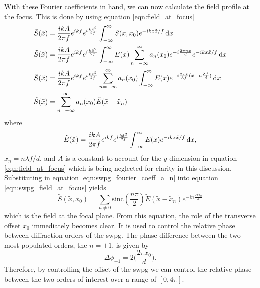 With these Fourier coefficients in hand, we can now calculate the field profile at the focus.  This is done by using equation \ref{eqn:field_at_focus}
\begin{equation}
\label{eqn:swpg_field_at_focus}
	\begin{aligned}
		\tilde{S}(\tilde{x}) &= \frac{i k A}{2\pi f}e^{ikf}e^{i\frac{k\tilde{x}^2}{2f}}\int_{-\infty}^{\infty}S(x,x_0)e^{-ikx\tilde{x}/f}\mathop{}\!\mathrm{d} x\\
		\tilde{S}(\tilde{x}) &= \frac{i k A}{2\pi f}e^{ikf}e^{i\frac{k\tilde{x}^2}{2f}}\int_{-\infty}^{\infty} E(x) \sum_{n=-\infty}^{\infty}a_n(x_0)e^{-i\frac{2\pi nx}{d}} e^{-ikx\tilde{x}/f}\mathop{}\!\mathrm{d} x\\
		\tilde{S}(\tilde{x}) &= \frac{i k A}{2\pi f}e^{ikf}e^{i\frac{k\tilde{x}^2}{2f}}\sum_{n=-\infty}^{\infty}a_n(x_0) \int_{-\infty}^{\infty} E(x) e^{-i\frac{2\pi x}{\lambda f}(\tilde{x} - n\frac{\lambda f}{d})}\mathop{}\!\mathrm{d} x\\
		\tilde{S}(\tilde{x}) &= \sum_{n=-\infty}^{\infty} a_n(x_0) \tilde{E}(\tilde{x} - \tilde{x}_n)
	\end{aligned}
\end{equation}
where
\begin{equation}
	\tilde{E}(\tilde{x}) = \frac{i k A}{2\pi f}e^{ikf}e^{i\frac{k\tilde{x}^2}{2f}} \int_{-\infty}^{\infty}E(x)e^{-ikx\tilde{x}/f}\mathop{}\!\mathrm{d} x,
\end{equation}
$x_n=n\lambda f/d$, and $A$ is a constant to account for the $y$ dimension in equation \ref{eqn:field_at_focus} which is being neglected for clarity in this discussion.  Substituting in equation \ref{eqn:swpg_fourier_coeff_a_n} into equation \ref{eqn:swpg_field_at_focus} yields
\begin{equation}
\label{eqn:swpg_field_at_focus_simple}
	\tilde{S}(\tilde{x}, x_0)=\sum_{n\neq 0}\mathrm{sinc}(\frac{n\pi}{2})\tilde{E}(\tilde{x}-\tilde{x}_n)e^{-in\frac{2\pi x_0}{d}}
\end{equation}
which is the field at the focal plane. From this equation, the role of the transverse offset $x_0$ immediately becomes clear.  It is used to control the relative phase between diffraction orders of the \gls{swpg}.  The phase difference between the two most populated orders, the $n=\pm 1$, is given by
\begin{equation}
\label{eqn:phase_diff}
	\Delta\phi_{\pm 1}=2\bigg(\frac{2\pi x_0}{d}\bigg).
\end{equation}
Therefore, by controlling the offset of the \gls{swpg} we can control the relative phase between the two orders of interest over a range of $[0,4\pi]$.


